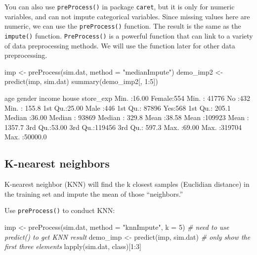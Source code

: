 \documentclass[
  12pt,
]{krantz}
\makeatletter
\newenvironment{Shaded}{\begin{snugshade}}{\end{snugshade}}
\newcommand{\AttributeTok}[1]{\textcolor[rgb]{0.61,0.61,0.61}{#1}}
\newcommand{\CommentTok}[1]{\textcolor[rgb]{0.37,0.37,0.37}{\textit{#1}}}
\newcommand{\DecValTok}[1]{\textcolor[rgb]{0.06,0.06,0.06}{#1}}
\newcommand{\FunctionTok}[1]{\textcolor[rgb]{0,0,0}{#1}}
\newcommand{\NormalTok}[1]{#1}
\newcommand{\OtherTok}[1]{\textcolor[rgb]{0.37,0.37,0.37}{#1}}
\newcommand{\SpecialCharTok}[1]{\textcolor[rgb]{0,0,0}{#1}}
\newcommand{\StringTok}[1]{\textcolor[rgb]{0.5,0.5,0.5}{#1}}
\newenvironment{kframe}{%
\medskip{}
\setlength{\fboxsep}{.8em}
 \def\at@end@of@kframe{}%
 \ifinner\ifhmode%
  \def\at@end@of@kframe{\end{minipage}}%
  \begin{minipage}{\columnwidth}%
 \fi\fi%
 \def\FrameCommand##1{\hskip\@totalleftmargin \hskip-\fboxsep
 \colorbox{shadecolor}{##1}\hskip-\fboxsep
     \hskip-\linewidth \hskip-\@totalleftmargin \hskip\columnwidth}%
 \MakeFramed {\advance\hsize-\width
   \@totalleftmargin\z@ \linewidth\hsize
   \@setminipage}}%
 {\par\unskip\endMakeFramed%
 \at@end@of@kframe}
\renewenvironment{Shaded}{\begin{kframe}}{\end{kframe}}
\makeatother
\begin{document}
You can also use \texttt{preProcess()} in package \texttt{caret}, but it is only for numeric variables, and can not impute categorical variables. Since missing values here are numeric, we can use the \texttt{preProcess()} function. The result is the same as the \texttt{impute()} function. \texttt{PreProcess()} is a powerful function that can link to a variety of data preprocessing methods. We will use the function later for other data preprocessing.

\begin{Shaded}
\begin{Highlighting}[]
\NormalTok{imp }\OtherTok{\textless{}{-}} \FunctionTok{preProcess}\NormalTok{(sim.dat, }\AttributeTok{method =} \StringTok{"medianImpute"}\NormalTok{)}
\NormalTok{demo\_imp2 }\OtherTok{\textless{}{-}} \FunctionTok{predict}\NormalTok{(imp, sim.dat)}
\FunctionTok{summary}\NormalTok{(demo\_imp2[, }\DecValTok{1}\SpecialCharTok{:}\DecValTok{5}\NormalTok{])}
\end{Highlighting}
\end{Shaded}

\begin{Shaded}
\begin{Highlighting}[]
\NormalTok{      age           gender        income       house       store\_exp      }
\NormalTok{ Min.   :16.00   Female:554   Min.   : 41776   No :432   Min.   :  155.8  }
\NormalTok{ 1st Qu.:25.00   Male  :446   1st Qu.: 87896   Yes:568   1st Qu.:  205.1  }
\NormalTok{ Median :36.00                Median : 93869             Median :  329.8  }
\NormalTok{ Mean   :38.58                Mean   :109923             Mean   : 1357.7  }
\NormalTok{ 3rd Qu.:53.00                3rd Qu.:119456             3rd Qu.:  597.3  }
\NormalTok{ Max.   :69.00                Max.   :319704             Max.   :50000.0  }
\end{Highlighting}
\end{Shaded}

\hypertarget{k-nearest-neighbors}{%
\subsection{K-nearest neighbors}\label{k-nearest-neighbors}}

K-nearest neighbor (KNN) will find the k closest samples (Euclidian distance) in the training set and impute the mean of those ``neighbors.''

Use \texttt{preProcess()} to conduct KNN:

\begin{Shaded}
\begin{Highlighting}[]
\NormalTok{imp }\OtherTok{\textless{}{-}} \FunctionTok{preProcess}\NormalTok{(sim.dat, }\AttributeTok{method =} \StringTok{"knnImpute"}\NormalTok{, }\AttributeTok{k =} \DecValTok{5}\NormalTok{)}
\CommentTok{\# need to use predict() to get KNN result}
\NormalTok{demo\_imp }\OtherTok{\textless{}{-}} \FunctionTok{predict}\NormalTok{(imp, sim.dat)}
\CommentTok{\# only show the first three elements}
\FunctionTok{lapply}\NormalTok{(sim.dat, class)[}\DecValTok{1}\SpecialCharTok{:}\DecValTok{3}\NormalTok{]}
\end{Highlighting}
\end{Shaded}
\end{document}
